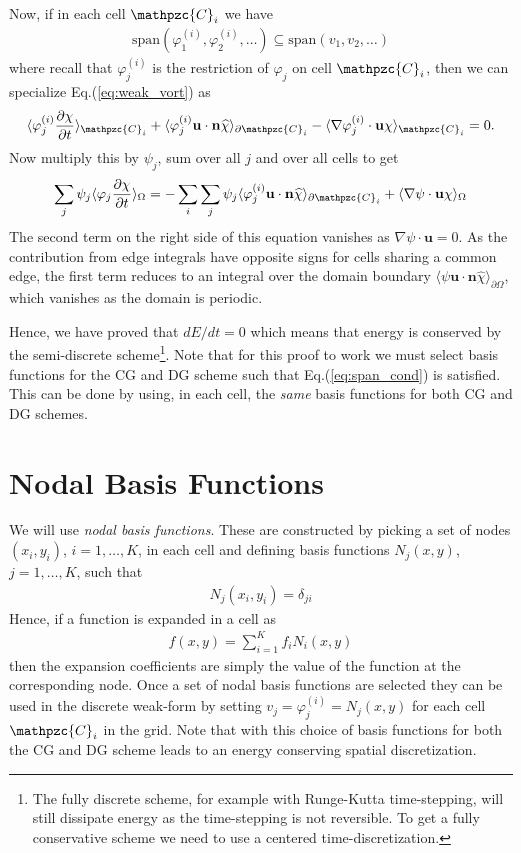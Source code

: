 \documentclass[11pt, reqno]{amsart}
\newcommand{\eqr}[1]{Eq.\thinspace(#1)}
\newcommand{\pfrac}[2]{\frac{\partial #1}{\partial #2}}
\newcommand{\mvec}[1]{\mathbf{#1}}
\newcommand{\script}[1]{\mathpzc{#1}}
\newcommand{\iprod}[2]{\langle{#1}\rangle_{#2}}
\theoremstyle{definition}
\begin{document}
Now, if in each cell $\script{C}_i$ we have
\begin{align}
  \textrm{span}(\varphi_1^{(i)},\varphi_2^{(i)},\ldots)
  \subseteq
  \textrm{span}(v_1,v_2,\ldots) \label{eq:span_cond}
\end{align}
where recall that $\varphi_j^{(i)}$ is the restriction of $\varphi_j$
on cell $\script{C}_i$, then we can specialize
\eqr{\ref{eq:weak_vort}} as
\begin{align}
  \iprod{\varphi_j^{(i)}\pfrac{\chi}{t}}{\script{C}_i} 
  +
  \iprod{\varphi_j^{(i)}\mvec{u}\cdot\mvec{n} \widehat{\chi}}{\partial \script{C}_i}
  -
  \iprod{\nabla \varphi_j^{(i)}\cdot \mvec{u}\chi}{\script{C}_i}
  = 0.
\end{align}
Now multiply this by $\psi_j$, sum over all $j$ and over all cells to
get
\begin{align}
  \sum_j \psi_j \iprod{\varphi_j \pfrac{\chi}{t}}{\Omega}
  =
  - 
  \sum_i \sum_j \psi_j \iprod{\varphi_j^{(i)}\mvec{u}\cdot\mvec{n} \widehat{\chi}}{\partial \script{C}_i}
  +
  \iprod{\nabla \psi \cdot \mvec{u}\chi}{\Omega}
\end{align}
The second term on the right side of this equation vanishes as $\nabla
\psi \cdot \mvec{u} = 0$. As the contribution from edge integrals have
opposite signs for cells sharing a common edge, the first term reduces
to an integral over the domain boundary
$\iprod{\psi\mvec{u}\cdot\mvec{n} \widehat{\chi}}{\partial\Omega}$,
which vanishes as the domain is periodic.

Hence, we have proved that $dE/dt = 0$ which means that energy is
conserved by the semi-discrete scheme\footnote{The fully discrete
  scheme, for example with Runge-Kutta time-stepping, will still
  dissipate energy as the time-stepping is not reversible. To get a
  fully conservative scheme we need to use a centered
  time-discretization.}. Note that for this proof to work we must
select basis functions for the CG and DG scheme such that
\eqr{\ref{eq:span_cond}} is satisfied. This can be done by using, in
each cell, the \emph{same} basis functions for both CG and DG schemes.

\section{Nodal Basis Functions}

We will use \emph{nodal basis functions}. These are constructed by
picking a set of nodes $(x_i,y_i)$, $i=1,\ldots,K$, in each cell and
defining basis functions $N_j(x,y)$, $j=1,\ldots,K$, such that
\begin{align}
  N_j(x_i,y_i) = \delta_{ji}
\end{align}
Hence, if a function is expanded in a cell as
\begin{align}
  f(x,y) = \sum_{i=1}^K f_{i}N_i(x,y)
\end{align}
then the expansion coefficients are simply the value of the function
at the corresponding node. Once a set of nodal basis functions are
selected they can be used in the discrete weak-form by setting
$v_j=\varphi_j^{(i)}=N_j(x,y)$ for each cell $\script{C}_i$ in the
grid. Note that with this choice of basis functions for both the CG
and DG scheme leads to an energy conserving spatial discretization.
\end{document}
